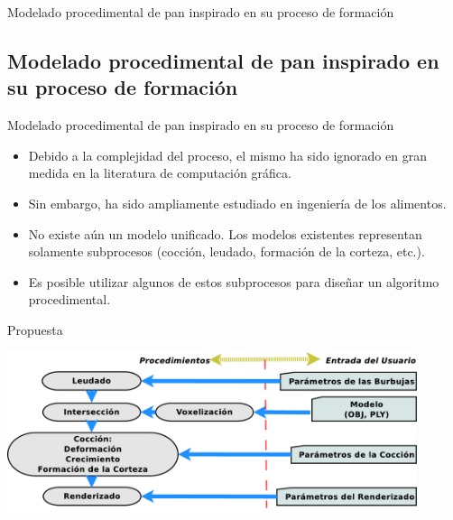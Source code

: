 \documentclass[spanish]{beamer}
\begin{document}
\begin{frame}
\begin{block}{}
\begin{center}
\vspace{1cm}
\huge{Modelado procedimental de pan inspirado en su proceso de formación}
\vspace{1cm}
\end{center}
\end{block}
\end{frame}

\subsection{Modelado procedimental de pan inspirado en su proceso de formación}
\begin{frame}{Modelado procedimental de pan inspirado en su proceso de formación}
\begin{block}{}
\begin{itemize}
\item Debido a la complejidad del proceso, el mismo ha sido ignorado en gran medida en la literatura de computación gráfica.

\item Sin embargo, ha sido ampliamente estudiado en ingeniería de los alimentos.

\item No existe aún un modelo unificado. Los modelos existentes representan solamente subprocesos (cocción, leudado, formación de la corteza, etc.).

\item Es posible utilizar algunos de estos subprocesos para diseñar un algoritmo procedimental.
\end{itemize}
\end{block}
\end{frame}

\begin{frame}{Propuesta}
\centerline{\includegraphics[width=12cm]{../figures/pipeline}}
\end{frame}
\end{document}
